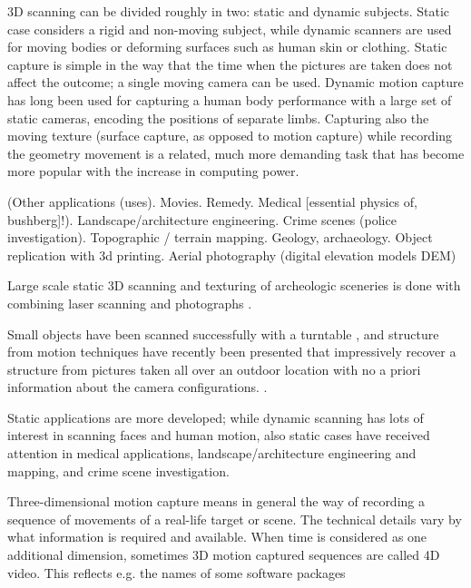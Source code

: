 
3D scanning can be divided roughly in two: static and dynamic subjects.
Static case considers a rigid and non-moving subject, while dynamic scanners are used for moving bodies or deforming surfaces such as human skin or clothing.
Static capture is simple in the way that the time when the pictures are taken does not affect the outcome; a single moving camera can be used.
Dynamic motion capture has long been used for capturing a human body performance with a large set of static cameras, encoding the positions of separate limbs.
Capturing also the moving texture (surface capture, as opposed to motion capture) while recording the geometry movement is a related, much more demanding task that has become more popular with the increase in computing power.


(Other applications (uses). Movies. Remedy. Medical [essential physics of, bushberg]!). Landscape/architecture engineering. Crime scenes (police investigation). Topographic / terrain mapping. Geology, archaeology. Object replication with 3d printing. Aerial photography (digital elevation models DEM)

Large scale static 3D scanning and texturing of archeologic sceneries is done with combining laser scanning and photographs \cite{lerma2010terrestrial}.

Small objects have been scanned successfully with a turntable \cite{fitzgibbon1998automatic}, and structure from motion techniques have recently been presented that impressively recover a structure from pictures taken all over an outdoor location with no a priori information about the camera configurations. \cite{goesele2007multi,furukawa2010towards}.

Static applications are more developed; while dynamic scanning has lots of interest in scanning faces and human motion, also static cases have received attention in medical applications, landscape/architecture engineering and mapping, and crime scene investigation. %


Three-dimensional motion capture means in general the way of recording a sequence of movements of a real-life target or scene.
The technical details vary by what information is required and available.
When time is considered as one additional dimension, sometimes 3D motion captured sequences are called 4D video.
This reflects e.g. the names of some software packages \cite{something4dgoogleitup}

